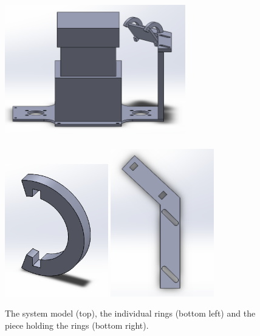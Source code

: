 \documentclass[12pt,oneside,a4paper]{book}
\begin{document}
\begin{figure}
  \centering
  \includegraphics[width=0.7\textwidth]{figs/mirrorassembly}\\
  ~\\
  \includegraphics[width=0.4\textwidth]{figs/mirrorholder}
  \includegraphics[width=0.4\textwidth]{figs/mirrorholdermount}
  \caption{The system model (top), the individual rings (bottom left) and the piece holding the rings (bottom right).}
  \label{fig:mirror-solidworks}
\end{figure}
\end{document}
